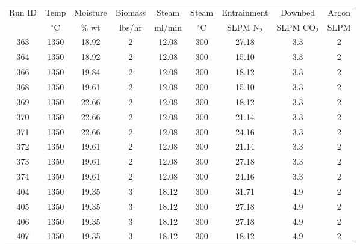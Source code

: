 \documentclass[11pt,twocolumn]{article}
\begin{document}
\begin{center}
\begin{tabular}{ccccccccc}
\toprule
Run ID &  Temp 		&  Moisture 	&  Biomass 	&  Steam 	&  Steam 		&  Entrainment & Downbed	 & Argon \\
{}       & $^\circ$C	& \% wt		& lbs/hr		& ml/min	& $^\circ$C	& SLPM N$_2$	& SLPM CO$_2$	 & SLPM \\
\midrule
363    &       1350 &     18.92 &             2 &     12.08 &       300 &       27.18 &                3.3 &           2 \\
364    &       1350 &     18.92 &             2 &     12.08 &       300 &       15.10 &                3.3 &           2 \\
366    &       1350 &     19.84 &             2 &     12.08 &       300 &       18.12 &                3.3 &           2 \\
368    &       1350 &     19.61 &             2 &     12.08 &       300 &       15.10 &                3.3 &           2 \\
369    &       1350 &     22.66 &             2 &     12.08 &       300 &       18.12 &                3.3 &           2 \\
370    &       1350 &     22.66 &             2 &     12.08 &       300 &       21.14 &                3.3 &           2 \\
371    &       1350 &     22.66 &             2 &     12.08 &       300 &       24.16 &                3.3 &           2 \\
372    &       1350 &     19.61 &             2 &     12.08 &       300 &       21.14 &                3.3 &           2 \\
373    &       1350 &     19.61 &             2 &     12.08 &       300 &       27.18 &                3.3 &           2 \\
374    &       1350 &     19.61 &             2 &     12.08 &       300 &       24.16 &                3.3 &           2 \\
404    &       1350 &     19.35 &             3 &     18.12 &       300 &       31.71 &                4.9 &           2 \\
405    &       1350 &     19.35 &             3 &     18.12 &       300 &       27.18 &                4.9 &           2 \\
406    &       1350 &     19.35 &             3 &     18.12 &       300 &       27.18 &                4.9 &           2 \\
407    &       1350 &     19.35 &             3 &     18.12 &       300 &       18.12 &                4.9 &           2 \\

\end{tabular}
\end{center}
\end{document}
